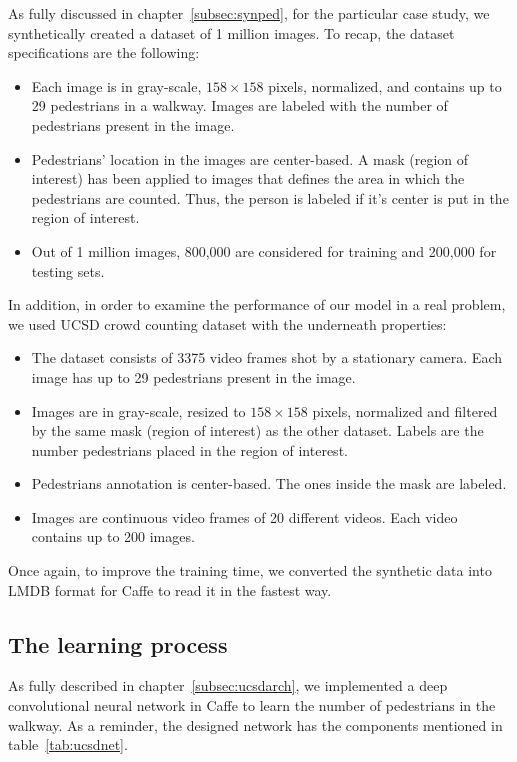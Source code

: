 As fully discussed in chapter~\ref{subsec:synped}, for the particular case study, we synthetically created a dataset of 1 million images. To recap, the dataset specifications are the following:
\begin{itemize}
\item Each image is in gray-scale, $158\times158$ pixels, normalized, and contains up to 29 pedestrians in a walkway. Images are labeled with the number of pedestrians present in the image.  
\item Pedestrians' location in the images are center-based. A mask (region of interest) has been applied to images that defines the area in which the pedestrians are counted. Thus, the person is labeled if it's center is put in the region of interest.   
\item Out of 1 million images, 800,000 are considered for training and 200,000 for testing sets.
\end{itemize} 

\noindent In addition, in order to examine the performance of our model in a real problem, we used UCSD crowd counting dataset \cite{chan2008privacy} with the underneath properties:

\begin{itemize}
\item The dataset consists of 3375 video frames shot by a stationary camera. Each image has up to 29 pedestrians present in the image.
\item Images are in gray-scale, resized to $158\times158$ pixels, normalized and filtered by the same mask (region of interest) as the other dataset. Labels are the number pedestrians placed in the region of interest.
\item Pedestrians annotation is center-based. The ones inside the mask are labeled.  
\item Images are continuous video frames of 20 different videos. Each video contains up to 200 images.  
\end{itemize}

Once again, to improve the training time, we converted the synthetic data into LMDB format for Caffe to read it in the fastest way.


\subsection{The learning process}

As fully described in chapter~\ref{subsec:ucsdarch}, we implemented a deep convolutional neural network in Caffe to learn the number of pedestrians in the walkway. As a reminder, the designed network has the components mentioned in table~\ref{tab:ucsdnet}.  

